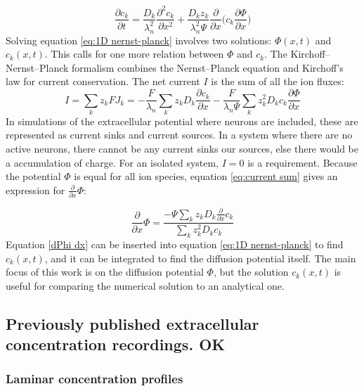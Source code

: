 \documentclass{article}
\begin{document}
\begin{equation}\label{eq:1D nernst-planck}
\frac{\partial c_k}{\partial t}= \frac{D_k}{\lambda_n^2} \frac{\partial^2 c_k}{\partial x^2}+\frac{D_k z_k}{\lambda_n^2 \Psi} \frac{\partial }{\partial x}  \bigg(c_k \frac{\partial \Phi}{\partial x} \bigg)
\end{equation}
Solving equation \ref{eq:1D nernst-planck} involves two solutions: $\Phi (x,t)$ and $c_k(x,t)$. This calls for one more relation between $\Phi$ and $c_k$. The Kirchoff--Nernst--Planck formalism \cite{Halnes2015} \cite{Halnes2016} combines the Nernst--Planck equation and Kirchoff's law for current conservation. 
The net current $I$ is the sum of all the ion fluxes:
\begin{equation}\label{eq:current sum}
I = \sum_{k}z_k FJ_k = -\frac{F}{\lambda_n}\sum_k z_k D_k  \frac{\partial c_k}{ \partial x} - \frac{F}{\lambda_n \Psi}\sum_k z_k^2D_k c_k \frac{\partial \Phi}{\partial x}
\end{equation}
In simulations of the extracellular potential where neurons are included, these are represented as current sinks and current sources. In a system where there are no active neurons, there cannot be any current sinks our sources, else there would be a accumulation of charge. For an isolated system, $I=0$ is a requirement. Because the potential 
$\Phi$ is equal for all ion species, equation \ref{eq:current sum} gives an  expression for $ \frac{\partial}{\partial x} \Phi$:

\begin{equation}\label{dPhi dx}
\frac{\partial}{\partial x} \Phi = \frac{-\Psi \sum_k z_k D_k \frac{\partial}{\partial x} c_k}{\sum_k z_k^2 D_k c_k}
\end{equation}
Equation \ref{dPhi dx} can be inserted into equation \ref{eq:1D nernst-planck} to find $c_k(x,t)$, and it can be integrated to find the diffusion potential itself. The main focus of this work is on the diffusion potential $\Phi$, but the solution $c_k(x,t)$ is useful for comparing the numerical solution to an analytical one.

\subsection{Previously published extracellular concentration recordings. OK}\label{EC c recordings}
 
\subsubsection{Laminar concentration profiles}
\end{document}
